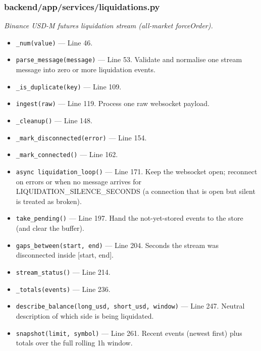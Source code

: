 \subsubsection*{backend/app/services/liquidations.py}
\textit{Binance USD-M futures liquidation stream (all-market forceOrder).}
\begin{itemize}[nosep,leftmargin=1.5em]
\item \texttt{\_\allowbreak{}num(\allowbreak{}value)} --- Line 46.
\item \texttt{parse\_\allowbreak{}message(\allowbreak{}message)} --- Line 53. Validate and normalise one stream message into zero or more liquidation events.
\item \texttt{\_\allowbreak{}is\_\allowbreak{}duplicate(\allowbreak{}key)} --- Line 109.
\item \texttt{ingest(\allowbreak{}raw)} --- Line 119. Process one raw websocket payload.
\item \texttt{\_\allowbreak{}cleanup(\allowbreak{})} --- Line 148.
\item \texttt{\_\allowbreak{}mark\_\allowbreak{}disconnected(\allowbreak{}error)} --- Line 154.
\item \texttt{\_\allowbreak{}mark\_\allowbreak{}connected(\allowbreak{})} --- Line 162.
\item \texttt{async liquidation\_\allowbreak{}loop(\allowbreak{})} --- Line 171. Keep the websocket open; reconnect on errors or when no message arrives for LIQUIDATION\_SILENCE\_SECONDS (a connection that is open but silent is treated as broken).
\item \texttt{take\_\allowbreak{}pending(\allowbreak{})} --- Line 197. Hand the not-yet-stored events to the store (and clear the buffer).
\item \texttt{gaps\_\allowbreak{}between(\allowbreak{}start,\allowbreak{} end)} --- Line 204. Seconds the stream was disconnected inside [start, end].
\item \texttt{stream\_\allowbreak{}status(\allowbreak{})} --- Line 214.
\item \texttt{\_\allowbreak{}totals(\allowbreak{}events)} --- Line 236.
\item \texttt{describe\_\allowbreak{}balance(\allowbreak{}long\_\allowbreak{}usd,\allowbreak{} short\_\allowbreak{}usd,\allowbreak{} window)} --- Line 247. Neutral description of which side is being liquidated.
\item \texttt{snapshot(\allowbreak{}limit,\allowbreak{} symbol)} --- Line 261. Recent events (newest first) plus totals over the full rolling 1h window.
\end{itemize}
